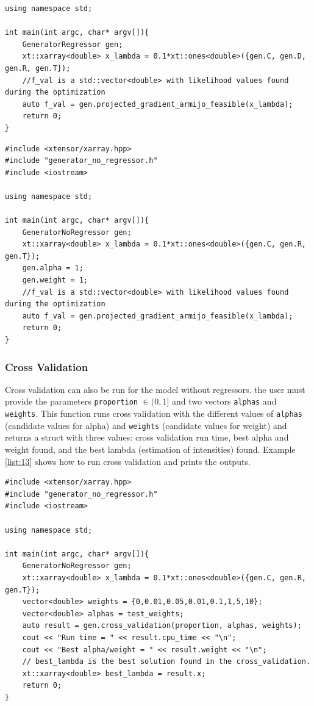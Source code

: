 \documentclass[article]{jss}
\begin{document}
{\begin{lstlisting}[label={list:11},caption=Calibration of the model with regressors in C++]
using namespace std;

int main(int argc, char* argv[]){
    GeneratorRegressor gen;
    xt::xarray<double> x_lambda = 0.1*xt::ones<double>({gen.C, gen.D, gen.R, gen.T});
    //f_val is a std::vector<double> with likelihood values found during the optimization
    auto f_val = gen.projected_gradient_armijo_feasible(x_lambda);
    return 0;
}
\end{lstlisting}


\begin{lstlisting}[label={list:12},caption=Calibration of the model without regressors in C++]
#include <xtensor/xarray.hpp>
#include "generator_no_regressor.h"
#include <iostream>

using namespace std;

int main(int argc, char* argv[]){
    GeneratorNoRegressor gen;
    xt::xarray<double> x_lambda = 0.1*xt::ones<double>({gen.C, gen.R, gen.T});
    gen.alpha = 1;
    gen.weight = 1;
    //f_val is a std::vector<double> with likelihood values found during the optimization
    auto f_val = gen.projected_gradient_armijo_feasible(x_lambda);
    return 0;
}

\end{lstlisting}


\subsubsection{Cross Validation}

Cross validation can also be run
for the model without regressors.
the user must provide the parameters {\tt{proportion}} \(\in (0,1]\) and two vectors {\tt{alphas}} and {\tt{weights}}. This function runs cross validation with the different
values of {\tt{alphas}} (candidate values for alpha) and {\tt{weights}} 
(candidate values for weight) and returns a struct with three values: cross validation run time, best alpha and weight found, and the best lambda (estimation of intensities) found. Example \ref{list:13} shows how to run cross validation and prints the outputs.


\begin{lstlisting}[label={list:13},caption=Cross validation in C++]
#include <xtensor/xarray.hpp>
#include "generator_no_regressor.h"
#include <iostream>

using namespace std;

int main(int argc, char* argv[]){
    GeneratorNoRegressor gen;
    xt::xarray<double> x_lambda = 0.1*xt::ones<double>({gen.C, gen.R, gen.T});
    vector<double> weights = {0,0.01,0.05,0.01,0.1,1,5,10};
    vector<double> alphas = test_weights;
    auto result = gen.cross_validation(proportion, alphas, weights);
    cout << "Run time = " << result.cpu_time << "\n";
    cout << "Best alpha/weight = " << result.weight << "\n";
    // best_lambda is the best solution found in the cross_validation.
    xt::xarray<double> best_lambda = result.x;
    return 0;
}


\end{lstlisting}}
\end{document}
